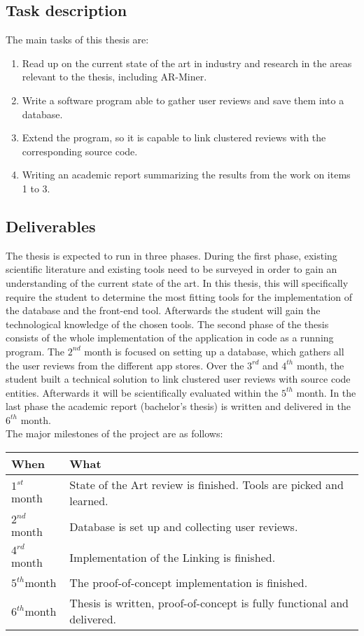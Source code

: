 \documentclass{task_description}
\begin{document}
\subsection*{Task description}
%

The main tasks of this thesis are:

\begin{enumerate}
\item Read up on the current state of the art in industry and research in the areas relevant to the thesis, including AR-Miner. %
\item Write a software program able to gather user reviews and save them into a database.
\item Extend the program, so it is capable to link clustered reviews with the corresponding source code.
\item Writing an academic report summarizing the results from the work on items 1 to 3.
\end{enumerate}


\subsection*{Deliverables}
%

The thesis is expected to run in three phases. During the first phase, existing scientific literature and existing tools need to be surveyed in order to gain an understanding of the current state of the art. In this thesis, this will specifically require the student to determine the most fitting tools for the implementation of the database and the front-end tool. Afterwards the student will gain the technological knowledge of the chosen tools. The second phase of the thesis consists of the whole implementation of the application in code as a running program. The $2^{\mathit{nd}}$ month is focused on setting up a database, which gathers all the user reviews from the different app stores. Over the $3^{\mathit{rd}}$ and $4^{\mathit{th}}$ month, the student built a technical solution to link clustered user reviews with source code entities. Afterwards it will be scientifically evaluated within the $5^{\mathit{th}}$ month. In the last phase the academic report (bachelor's thesis) is written and delivered in the  $6^{\mathit{th}}$ month.\\

The major milestones of the project are as follows:

\begin{tabular}{lp{10cm}}
When & What \\
\hline\noalign{\smallskip}
$1^{\mathit{st}}$ month & State of the Art review is finished. Tools are picked and learned. \\
$2^{\mathit{nd}}$ month & Database is set up and collecting user reviews. \\
$4^{\mathit{rd}}$ month &  Implementation of the Linking is finished. \\
$5^{\mathit{th}}$month & The proof-of-concept implementation is finished.\\
$6^{\mathit{th}}$month & Thesis is written, proof-of-concept is fully functional and delivered.
\end{tabular}
\end{document}
